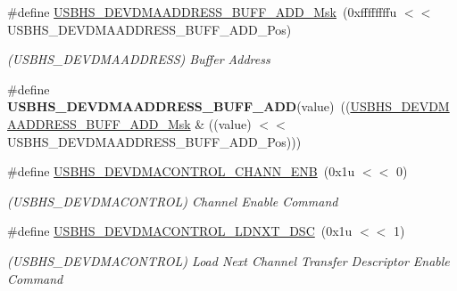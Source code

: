 \begin{DoxyCompactItemize}
\#define \mbox{\hyperlink{group__SAMS70__USBHS_ga379c376b6bcff645f7960a5086854f03}{U\+S\+B\+H\+S\+\_\+\+D\+E\+V\+D\+M\+A\+A\+D\+D\+R\+E\+S\+S\+\_\+\+B\+U\+F\+F\+\_\+\+A\+D\+D\+\_\+\+Msk}}~(0xffffffffu $<$$<$ U\+S\+B\+H\+S\+\_\+\+D\+E\+V\+D\+M\+A\+A\+D\+D\+R\+E\+S\+S\+\_\+\+B\+U\+F\+F\+\_\+\+A\+D\+D\+\_\+\+Pos)
\begin{DoxyCompactList}\small\item\em (U\+S\+B\+H\+S\+\_\+\+D\+E\+V\+D\+M\+A\+A\+D\+D\+R\+E\+SS) Buffer Address \end{DoxyCompactList}\item 
\mbox{\label{group__SAMS70__USBHS_ga97ea8206c20f15d27b490e7071645c66}} 
\#define {\bfseries U\+S\+B\+H\+S\+\_\+\+D\+E\+V\+D\+M\+A\+A\+D\+D\+R\+E\+S\+S\+\_\+\+B\+U\+F\+F\+\_\+\+A\+DD}(value)~((\mbox{\hyperlink{group__SAMV71__USBHS_ga379c376b6bcff645f7960a5086854f03}{U\+S\+B\+H\+S\+\_\+\+D\+E\+V\+D\+M\+A\+A\+D\+D\+R\+E\+S\+S\+\_\+\+B\+U\+F\+F\+\_\+\+A\+D\+D\+\_\+\+Msk}} \& ((value) $<$$<$ U\+S\+B\+H\+S\+\_\+\+D\+E\+V\+D\+M\+A\+A\+D\+D\+R\+E\+S\+S\+\_\+\+B\+U\+F\+F\+\_\+\+A\+D\+D\+\_\+\+Pos)))
\item 
\mbox{\label{group__SAMS70__USBHS_gafc5eaec12bce454e6829bdfc4c4594a5}} 
\#define \mbox{\hyperlink{group__SAMS70__USBHS_gafc5eaec12bce454e6829bdfc4c4594a5}{U\+S\+B\+H\+S\+\_\+\+D\+E\+V\+D\+M\+A\+C\+O\+N\+T\+R\+O\+L\+\_\+\+C\+H\+A\+N\+N\+\_\+\+E\+NB}}~(0x1u $<$$<$ 0)
\begin{DoxyCompactList}\small\item\em (U\+S\+B\+H\+S\+\_\+\+D\+E\+V\+D\+M\+A\+C\+O\+N\+T\+R\+OL) Channel Enable Command \end{DoxyCompactList}\item 
\mbox{\label{group__SAMS70__USBHS_ga90c878919619dac6d5c5042f75a54653}} 
\#define \mbox{\hyperlink{group__SAMS70__USBHS_ga90c878919619dac6d5c5042f75a54653}{U\+S\+B\+H\+S\+\_\+\+D\+E\+V\+D\+M\+A\+C\+O\+N\+T\+R\+O\+L\+\_\+\+L\+D\+N\+X\+T\+\_\+\+D\+SC}}~(0x1u $<$$<$ 1)
\begin{DoxyCompactList}\small\item\em (U\+S\+B\+H\+S\+\_\+\+D\+E\+V\+D\+M\+A\+C\+O\+N\+T\+R\+OL) Load Next Channel Transfer Descriptor Enable Command \end{DoxyCompactList}\item 
\mbox{\label{group__SAMS70__USBHS_ga4a472d5573d59ca01ab998d35fe42134}} 

\end{DoxyCompactItemize}
